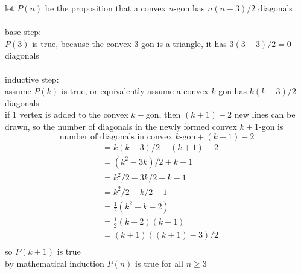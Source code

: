 \documentclass[12pt,border=4pt,multi]{article}%
\begin{document}
let $P(n)$ be the proposition that a convex $n$-gon has $n(n - 3)/2$ diagonals\\
\\
base step:\\
$P(3)$ is true, because the convex 3-gon is a triangle, it has $3(3 - 3) / 2 = 0$ diagonals\\
\\
inductive step:\\
assume $P(k)$ is true, or equivalently assume a convex $k$-gon has $k(k - 3)/2$ diagonals\\
if 1 vertex is added to the convex $k-$gon, then $(k + 1) - 2$ new lines can be drawn, so the number of diagonals in the newly formed convex $k + 1$-gon is 
\[\text{number of diagonals in convex $k$-gon} + (k + 1) - 2\]
\begin{align*}
    &= k(k - 3) / 2 + (k + 1) - 2\\
    &= (k^2 - 3k) / 2 + k - 1\\
    &= k^2 / 2 - 3k / 2 + k - 1\\
    &= k^2 / 2 - k / 2 - 1\\
    &= \frac{1}{2}(k^2 - k - 2)\\
    &= \frac{1}{2}(k - 2)(k + 1)\\
    &= (k + 1)((k + 1) - 3) / 2\\
\end{align*}
so $P(k + 1)$ is true\\
by mathematical induction $P(n)$ is true for all $n \geq 3$\\
\end{document}

